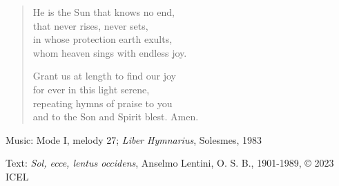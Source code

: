 \hymn



\setlength{\leftmargini}{2em}
\begin{verse}
He is the Sun that knows no end,\\
that never rises, never sets,\\
in whose protection earth exults,\\
whom heaven sings with endless joy.

Grant us at length to find our joy\\
for ever in this light serene,\\
repeating hymns of praise to you\\
and to the Son and Spirit blest. Amen.
\end{verse}

\setlength{\leftmargini}{\defleftmargini}

\begin{hymnsource}
Music: Mode I, melody 27; \emph{Liber Hymnarius}, Solesmes, 1983

Text: \emph{Sol, ecce, lentus occidens}, Anselmo Lentini, O. S. B., 1901-1989, © 2023 ICEL
\end{hymnsource}
